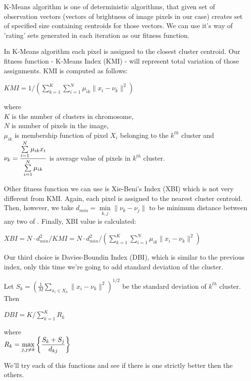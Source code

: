 \documentclass[11pt,leqno]{article}
\theoremstyle{mytheoremstyle}
\theoremstyle{mytheoremstyle}
\begin{document}
K-Means algorithm is one of deterministic algorithms, that given set of observation vectors (vectors of brightness of image pixels in our case) creates set of specified size containing centroids for those vectors. We can use it's way of 'rating' sets generated in each iteration as our fitness function.

In K-Means algorithm each pixel is assigned to the closest cluster centroid. Our fitness function - K-Means Index (KMI) - will represent total variation of those assignments. KMI is computed as follows:

\begin{center}
$KMI = 1/\left( \sum\limits_{k=1}^K \sum\limits_{i=1}^N \mu_{ik} \parallel x_i - \nu_k \parallel^2 \right)$
\end{center}

\noindent where \\ $K$ is the number of clusters in chromosome, \\ $N$ is number of pixels in the image, \\ $\mu_{ik}$ is membership function of pixel $X_i$ belonging to the $k^{th}$ cluster and \\ $\nu_k = \mathlarger{\frac{\sum\limits_{i=1}^N \mu_{ik} x_i}{\sum\limits_{i=1}^N \mu_{ik}}}$ is average value of pixels in $k^{th}$ cluster.

\vspace{0.5cm}

Other fitness function we can use is Xie-Beni's Index (XBI) which is not very different from KMI. Again, each pixel is assigned to the nearest cluster centroid. Then, however, we take $d_{min} = \min\limits_{k,j} \parallel \nu_k - \nu_j \parallel$ to be minimum distance between any two of . Finally, XBI value is calculated:

\begin{center}
$XBI = N \cdot d_{min}^2 / KMI = N \cdot d_{min}^2 / \left( \sum\limits_{k=1}^K \sum\limits_{i=1}^N \mu_{ik} \parallel x_i - \nu_k \parallel^2 \right)$
\end{center}

Our third choice is Davies-Boundin Index (DBI), which is similar to the previous index, only this time we're going to add standard deviation of the cluster.

Let $S_k = \left( \frac{1}{M} \sum\limits_{x_i \in X_k} \parallel x_i - \nu_k \parallel^2 \right)^{1/2}$ be the standard deviation of $k^{th}$ cluster. Then

\begin{center}
$DBI = K / \sum\limits_{k = 1}^K R_k$

where \\ $R_k = \max\limits_{j, j\neq k} \mathlarger{\left\lbrace \frac{S_k + S_j}{d_{kj}} \right\rbrace}$
\end{center}
We'll try each of this functions and see if there is one strictly better then the others.
\end{document}

